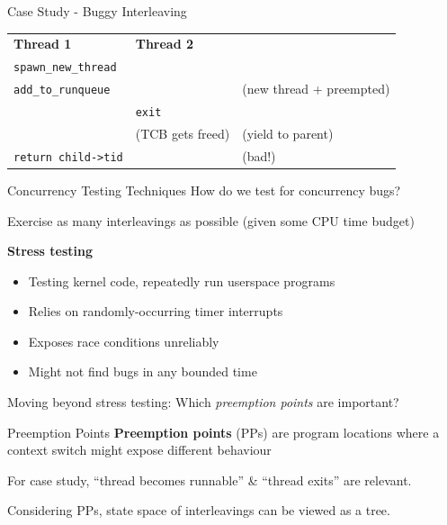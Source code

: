 \documentclass[xcolor=dvipsnames]{beamer}
\begin{document}
\begin{frame}{Case Study - Buggy Interleaving}
	\begin{tabular}{|l|l|l}
		\cline{1-2}
		{\bf Thread 1} & {\bf Thread 2} & \\
		\cline{1-2}
		\texttt{spawn\_new\_thread} && \\
		\cline{1-2}
		\texttt{add\_to\_runqueue} && (new thread + preempted) \\
		\cline{1-2}
		& \texttt{exit} & \\
		\cline{1-2}
		& (TCB gets freed) & (yield to parent) \\
		\cline{1-2}
		\texttt{return child->tid} && (bad!) \\
		\cline{1-2}
	\end{tabular}
\end{frame}


\begin{frame}{Concurrency Testing Techniques}
	How do we test for concurrency bugs?
	\linegap

	Exercise as many interleavings as possible (given some CPU time budget)
	\linegap

	\textbf{Stress testing}
	\begin{itemize}
		\item Testing kernel code, repeatedly run userspace programs
		\item Relies on randomly-occurring timer interrupts %
		\item Exposes race conditions unreliably
		\item Might not find bugs in any bounded time
	\end{itemize}
	\pause
	\linegap

	Moving beyond stress testing: Which {\em preemption points} are important?
\end{frame}

\begin{frame}{Preemption Points}
	\textbf{Preemption points} (PPs) are program locations where a context switch might expose different behaviour
	\linegap

	For case study, ``thread becomes runnable'' \& ``thread exits'' are relevant.
	\linegap

	Considering PPs, state space of interleavings can be viewed as a tree.
\end{frame}
\end{document}
